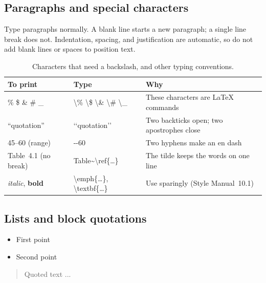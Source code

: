 \documentclass[11pt,a4paper]{article}
\newcommand\thd[1]{\bfseries #1}
\begin{document}
\subsection{Paragraphs and special characters}

Type paragraphs normally. A blank line starts a new paragraph; a single line
break does not. Indentation, spacing, and justification are automatic, so do
not add blank lines or spaces to position text.

\begin{table}[htbp]
\caption{Characters that need a backslash, and other typing conventions.}
\label{tab:chars}
\small
\begin{tabularx}{\textwidth}{@{}p{34mm}>{\ttfamily}p{44mm}X@{}}
\toprule
\thd{To print} & \normalfont\thd{Type} & \thd{Why} \\
\midrule
\%  \quad \$ \quad \& \quad \# \quad \_ & \textbackslash\% \textbackslash\$ \textbackslash\& \textbackslash\# \textbackslash\_ & These characters are LaTeX commands \\
``quotation''            & `{}`quotation'{}'          & Two backticks open; two apostrophes close \\
45--60 (range)           & 45-{}-60                   & Two hyphens make an en dash \\
Table~4.1 (no break)     & Table\textasciitilde\textbackslash ref\{\ldots\} & The tilde keeps the words on one line \\
\emph{italic}, \textbf{bold} & \textbackslash emph\{\ldots\}, \textbackslash textbf\{\ldots\} & Use sparingly (Style Manual~10.1) \\
\bottomrule
\end{tabularx}
\end{table}

\subsection{Lists and block quotations}

\begin{code}
\begin{itemize}         %
  \item First point
  \item Second point
\end{itemize}

\begin{quote}           %
Quoted text ... \parencite[p.~18]{smith2023}
\end{quote}
\end{code}
\end{document}
